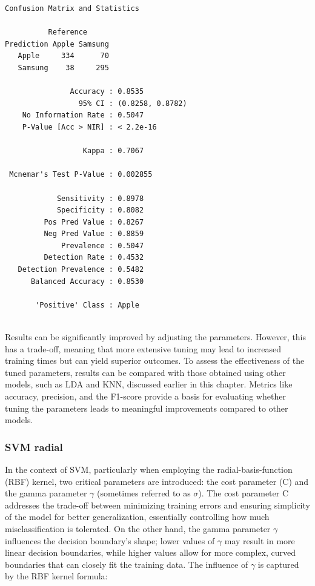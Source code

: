 \begin{verbatim}
Confusion Matrix and Statistics

          Reference
Prediction Apple Samsung
   Apple     334      70
   Samsung    38     295
                                          
               Accuracy : 0.8535          
                 95% CI : (0.8258, 0.8782)
    No Information Rate : 0.5047          
    P-Value [Acc > NIR] : < 2.2e-16       
                                          
                  Kappa : 0.7067          
                                          
 Mcnemar's Test P-Value : 0.002855        
                                          
            Sensitivity : 0.8978          
            Specificity : 0.8082          
         Pos Pred Value : 0.8267          
         Neg Pred Value : 0.8859          
             Prevalence : 0.5047          
         Detection Rate : 0.4532          
   Detection Prevalence : 0.5482          
      Balanced Accuracy : 0.8530          
                                          
       'Positive' Class : Apple           
                                          
\end{verbatim}

Results can be significantly improved by adjusting
the parameters. However, this has a trade-off, meaning that more extensive tuning may lead to increased training times but can yield superior
outcomes. To assess the effectiveness of the tuned parameters, results
can be compared with those obtained using other models, such as LDA and
KNN, discussed earlier in this chapter. Metrics like accuracy,
precision, and the F1-score provide a basis for evaluating whether
tuning the parameters leads to meaningful improvements compared to other models.

\subsubsection{SVM radial}\label{svm-radial}

In the context of SVM, particularly when employing the radial-basis-function (RBF) kernel, two critical parameters are introduced: the cost
parameter (C) and the gamma parameter \(\gamma\) (sometimes referred to
as \(\sigma\)). The cost parameter C addresses the trade-off between
minimizing training errors and ensuring simplicity of the model for better
generalization, essentially controlling how much misclassification is
tolerated. On the other hand, the gamma parameter \(\gamma\) influences
the decision boundary's shape; lower values of \(\gamma\) may result in
more linear decision boundaries, while higher values allow for more
complex, curved boundaries that can closely fit the training data. The
influence of \(\gamma\) is captured by the RBF kernel formula:


